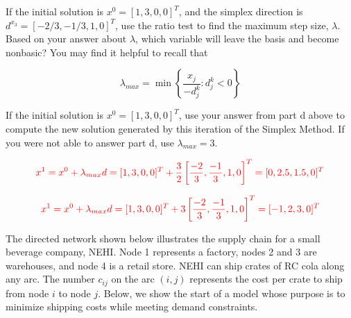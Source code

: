 \begin{parts}
\vfill
\newpage

 If the initial solution is $x^0 = [1,3,0,0]^T$, and the simplex direction is $d^{x_3} = [-2/3, -1/3, 1, 0]^T$, use the ratio test to find the maximum step size, $\lambda$.  Based on your answer about $\lambda$, which variable will leave the basis and become nonbasic? You may find it helpful to recall that 

\[
\lambda_{max} = \min \left\{ \frac{x_j}{-d_j^k}:d_j^k < 0 \right\}
\]

\vspace{0.5cm}

\vfill

 If the initial solution is $x^0 = [1,3,0,0]^T$, use your answer from part d above to compute the new solution generated by this iteration of the Simplex Method.  If you were not able to answer part d, use $\lambda_{max} = 3$.


\[
\textcolor{red}{x^1 = x^0 + \lambda_{max} d = [1,3,0,0]^T + \frac{3}{2} \left[\frac{-2}{3},\frac{-1}{3},1,0 \right]^T = [0,2.5,1.5,0]^T}
\]


\[
\textcolor{red}{x^1 = x^0 + \lambda_{max} d = [1,3,0,0]^T + 3\left[\frac{-2}{3},\frac{-1}{3},1,0 \right]^T = [-1,2,3,0]^T}
\]

\vfill

\end{parts}

\newpage

 The directed network shown below illustrates the supply chain for a small beverage company, NEHI. Node 1 represents a factory, nodes 2 and 3 are warehouses, and node 4 is a retail store. NEHI can ship crates of RC cola along any arc. The number $c_{ij}$ on the arc $(i,j)$ represents the cost per crate to ship from node $i$ to node $j$. Below, we show the start of a model whose purpose is to minimize shipping costs while meeting demand constraints. 

